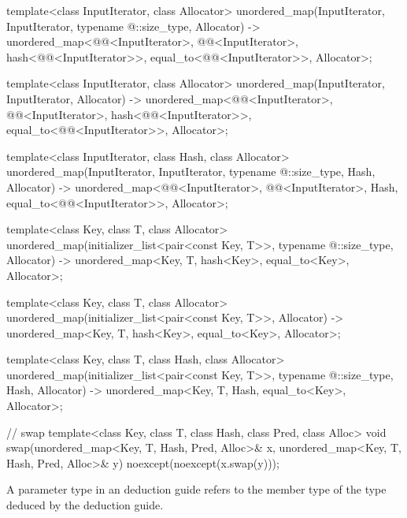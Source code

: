 \begin{codeblock}
{  template<class InputIterator, class Allocator>
    unordered_map(InputIterator, InputIterator, typename @\seebelow@::size_type, Allocator)
      -> unordered_map<@@<InputIterator>, @@<InputIterator>,
                       hash<@@<InputIterator>>,
                       equal_to<@@<InputIterator>>, Allocator>;

  template<class InputIterator, class Allocator>
    unordered_map(InputIterator, InputIterator, Allocator)
      -> unordered_map<@@<InputIterator>, @@<InputIterator>,
                       hash<@@<InputIterator>>,
                       equal_to<@@<InputIterator>>, Allocator>;

  template<class InputIterator, class Hash, class Allocator>
    unordered_map(InputIterator, InputIterator, typename @\seebelow@::size_type, Hash, Allocator)
      -> unordered_map<@@<InputIterator>, @@<InputIterator>, Hash,
                       equal_to<@@<InputIterator>>, Allocator>;

  template<class Key, class T, class Allocator>
    unordered_map(initializer_list<pair<const Key, T>>, typename @\seebelow@::size_type,
                  Allocator)
      -> unordered_map<Key, T, hash<Key>, equal_to<Key>, Allocator>;

  template<class Key, class T, class Allocator>
    unordered_map(initializer_list<pair<const Key, T>>, Allocator)
      -> unordered_map<Key, T, hash<Key>, equal_to<Key>, Allocator>;

  template<class Key, class T, class Hash, class Allocator>
    unordered_map(initializer_list<pair<const Key, T>>, typename @\seebelow@::size_type, Hash,
                  Allocator)
      -> unordered_map<Key, T, Hash, equal_to<Key>, Allocator>;

  // swap
  template<class Key, class T, class Hash, class Pred, class Alloc>
    void swap(unordered_map<Key, T, Hash, Pred, Alloc>& x,
              unordered_map<Key, T, Hash, Pred, Alloc>& y)
      noexcept(noexcept(x.swap(y)));
}
\end{codeblock}

\pnum
A  parameter type in an  deduction guide
refers to the  member type of the type deduced by the deduction guide.


